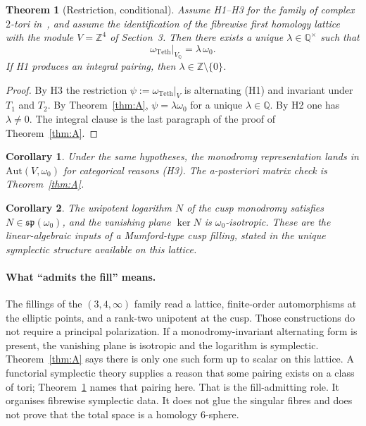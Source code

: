 \documentclass[11pt,a4paper]{article}
\newtheorem{theorem}{Theorem}
\newtheorem{corollary}{Corollary}
\theoremstyle{definition}
\theoremstyle{remark}
\newcommand{\Q}{\mathbb{Q}}
\newcommand{\Z}{\mathbb{Z}}
\newcommand{\Aut}{\mathrm{Aut}}
\newcommand{\spq}{\mathfrak{sp}}
\newcommand{\teth}{\omega_{\mathrm{Teth}}}
\begin{document}
\begin{theorem}[Restriction, conditional]\label{thm:C}
Assume H1--H3 for the family of complex $2$-tori in~\cite{AlpogeS6}, and assume the identification of the fibrewise first homology lattice with the module $V=\Z^4$ of Section~3. Then there exists a unique $\lambda\in\Q^\times$ such that
\[
\teth\big|_{V_{\Q}}=\lambda\,\omega_0.
\]
If H1 produces an integral pairing, then $\lambda\in\Z\setminus\{0\}$.
\end{theorem}

\begin{proof}
By H3 the restriction $\psi:=\teth|_V$ is alternating (H1) and invariant under $T_1$ and $T_2$. By Theorem~\ref{thm:A}, $\psi=\lambda\omega_0$ for a unique $\lambda\in\Q$. By H2 one has $\lambda\neq 0$. The integral clause is the last paragraph of the proof of Theorem~\ref{thm:A}.
\end{proof}

\begin{corollary}
Under the same hypotheses, the monodromy representation lands in $\Aut(V,\omega_0)$ for categorical reasons (H3). The a-posteriori matrix check is Theorem~\ref{thm:A}.
\end{corollary}

\begin{corollary}
The unipotent logarithm $N$ of the cusp monodromy satisfies $N\in\spq(\omega_0)$, and the vanishing plane $\ker N$ is $\omega_0$-isotropic. These are the linear-algebraic inputs of a Mumford-type cusp filling, stated in the unique symplectic structure available on this lattice.
\end{corollary}

\paragraph{What ``admits the fill'' means.}
The fillings of the $(3,4,\infty)$ family read a lattice, finite-order automorphisms at the elliptic points, and a rank-two unipotent at the cusp. Those constructions do not require a principal polarization. If a monodromy-invariant alternating form is present, the vanishing plane is isotropic and the logarithm is symplectic. Theorem~\ref{thm:A} says there is only one such form up to scalar on this lattice. A functorial symplectic theory supplies a reason that some pairing exists on a class of tori; Theorem~\ref{thm:C} names that pairing here. That is the fill-admitting role. It organises fibrewise symplectic data. It does not glue the singular fibres and does not prove that the total space is a homology $6$-sphere.
\end{document}
